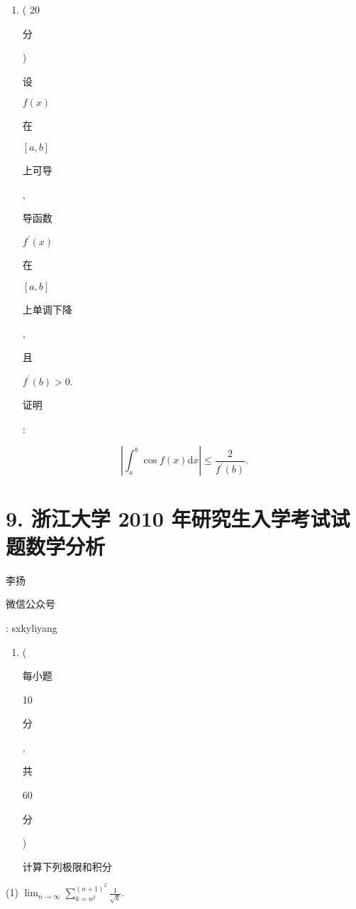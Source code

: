 \documentclass[10pt]{article}
\begin{document}
\begin{enumerate}
  \item ( 20 \begin{CJK}{UTF8}{mj}分\end{CJK}) \begin{CJK}{UTF8}{mj}设\end{CJK} $f(x)$ \begin{CJK}{UTF8}{mj}在\end{CJK} $[a, b]$ \begin{CJK}{UTF8}{mj}上可导\end{CJK}, \begin{CJK}{UTF8}{mj}导函数\end{CJK} $f^{\prime}(x)$ \begin{CJK}{UTF8}{mj}在\end{CJK} $[a, b]$ \begin{CJK}{UTF8}{mj}上单调下降\end{CJK}, \begin{CJK}{UTF8}{mj}且\end{CJK} $f^{\prime}(b)>0$. \begin{CJK}{UTF8}{mj}证明\end{CJK}:

\end{enumerate}
$$
\left|\int_{a}^{b} \cos f(x) \mathrm{d} x\right| \leqslant \frac{2}{f^{\prime}(b)} .
$$

\section{9. 浙江大学 2010 年研究生入学考试试题数学分析}
\begin{CJK}{UTF8}{mj}李扬\end{CJK}

\begin{CJK}{UTF8}{mj}微信公众号\end{CJK}: sxkyliyang

\begin{enumerate}
  \item (\begin{CJK}{UTF8}{mj}每小题\end{CJK} 10 \begin{CJK}{UTF8}{mj}分\end{CJK}, \begin{CJK}{UTF8}{mj}共\end{CJK} 60 \begin{CJK}{UTF8}{mj}分\end{CJK}) \begin{CJK}{UTF8}{mj}计算下列极限和积分\end{CJK}
\end{enumerate}
(1) $\lim _{n \rightarrow \infty} \sum_{k=n^{2}}^{(n+1)^{2}} \frac{1}{\sqrt{k}}$.
\end{document}
